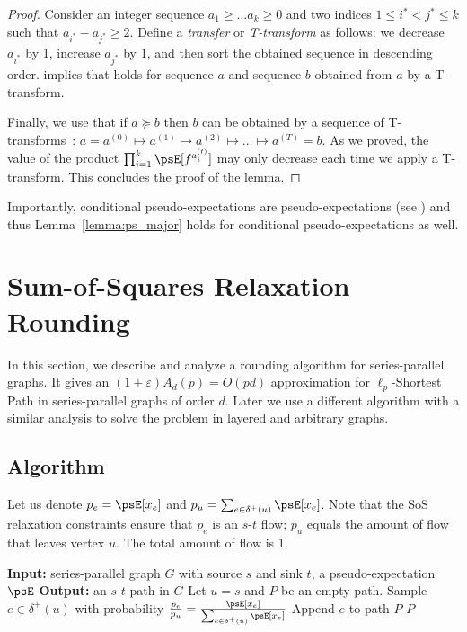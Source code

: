 \documentclass[11pt,a4paper]{article}
\begin{document}
\begin{proof}
Consider an integer sequence $a_1\geq \dots a_k \geq 0$ and two indices $1\leq i^* < j^*\leq k$ such that $a_{i^*} - a_{j^*} \geq 2$. Define a \textit{transfer} or \textit{T-transform} as follows: we decrease $a_{i^*}$ by 1, increase $a_{j^*}$ by 1, and then sort the obtained sequence in descending order.  implies that  holds for sequence $a$ and sequence $b$ obtained from $a$ by a T-transform. 

Finally, we use that if $a\succeq b$ then $b$ can be obtained by a sequence of T-transforms~\cite{M1902}: $a = a^{(0)} \mapsto a^{(1)} \mapsto a^{(2)}\mapsto \dots \mapsto a^{(T)} = b$. As we proved, the value of the product $\prod_{i=1}^k \psE[f^{a^{(t)}_i}]$ may only decrease each time we apply a T-transform.
This concludes the proof of the lemma.
\end{proof}


Importantly, conditional pseudo-expectations are pseudo-expectations (see ) and thus Lemma~\ref{lemma:ps_major} holds for conditional pseudo-expectations as well.


\section{Sum-of-Squares Relaxation Rounding}\label{sec:rounding}
In this section, we describe and analyze a rounding algorithm for  series-parallel graphs. It gives an $(1+\varepsilon) A_d(p) = O(pd)$ approximation for $\ell_p$-Shortest Path in series-parallel graphs of order $d$. 
Later we use a different algorithm with a similar analysis to solve the problem in layered and arbitrary graphs.

\subsection{Algorithm}
Let us denote $p_e = \psE[x_e]$ and $p_u = \sum_{e\in\delta^+(u)} \psE[x_e]$. Note that the SoS relaxation constraints ensure that $p_e$ is an $s$-$t$ flow; $p_u$ equals the amount of flow that leaves vertex $u$. The total amount of flow is 1.

\begin{algorithm}[H]
\caption{Rounding algorithm for SoS}\label{alg:rounding}
\begin{algorithmic}[1]
\State \textbf{Input:} series-parallel graph $G$ with source $s$ and sink $t$, a pseudo-expectation $\psE$ 
\State \textbf{Output:} an $s$-$t$ path in $G$
\State Let $u=s$ and $P$ be an empty path.
    \State Sample \(e\in \delta^+(u)\) with probability \(\frac{p_e}{p_u} = \frac{\psE[x_e]}{\sum_{e\in\delta^+(u)} \psE[x_e]}\)
    \State Append $e$ to path $P$
\EndWhile
\State \Return \(P\)\label{alg_line:rounding_sp_return}
\end{algorithmic}
\end{algorithm}
\end{document}
